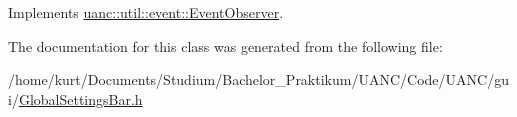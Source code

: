 Implements \hyperlink{classuanc_1_1util_1_1event_1_1_event_observer_af1640e34db3379eaba8c817a92199807}{uanc\+::util\+::event\+::\+Event\+Observer}.



The documentation for this class was generated from the following file\+:\begin{DoxyCompactItemize}
\item 
/home/kurt/\+Documents/\+Studium/\+Bachelor\+\_\+\+Praktikum/\+U\+A\+N\+C/\+Code/\+U\+A\+N\+C/gui/\hyperlink{_global_settings_bar_8h}{Global\+Settings\+Bar.\+h}\end{DoxyCompactItemize}
